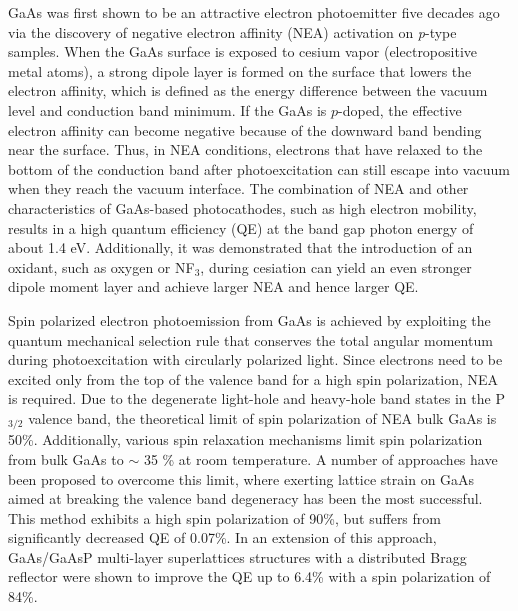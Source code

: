 GaAs was first shown to be an attractive electron photoemitter five decades ago via the discovery of negative electron affinity (NEA) activation on \emph{p}-type samples.\cite{scheer1965}
When the GaAs surface is exposed to cesium vapor (electropositive metal atoms), a strong dipole layer is formed on the surface that lowers the electron affinity, which is defined as the energy difference between the vacuum level and conduction band minimum.\cite{liu2017_ComprehensiveEvaluationFactors} If the GaAs is $p$-doped, the effective electron affinity can become negative because of the downward band bending near the surface. Thus, in NEA conditions, electrons that have relaxed to the bottom of the conduction band after photoexcitation can still escape into vacuum when they reach the vacuum interface. The combination of NEA and other characteristics of GaAs-based photocathodes, such as high electron mobility, results in a high quantum efficiency (QE) at the band gap photon energy of about 1.4 eV.\cite{pierce1976} Additionally, it was demonstrated that the introduction of an oxidant, such as oxygen or NF$_3$, during cesiation can yield an even stronger dipole moment layer and achieve larger NEA and hence larger QE.\cite{su1983,ciccacci1991_ComparativeStudyPreparation}



Spin polarized electron photoemission from GaAs is achieved by exploiting the quantum mechanical selection rule that conserves the total angular momentum during photoexcitation with circularly polarized light.\cite{pierce1976} Since electrons need to be excited only from the top of the valence band for a high spin polarization, NEA is required.
Due to the degenerate light-hole and heavy-hole band states in the P$_{3/2}$ valence band, the theoretical limit of spin polarization of NEA bulk GaAs is 50\%.
Additionally, various spin relaxation mechanisms limit spin polarization from bulk GaAs to $\sim$ 35 \% at room temperature.\cite{liu2017_ComprehensiveEvaluationFactors} A number of approaches have been proposed to overcome this limit,\cite{clayburn2013,mccarter2014_MeasurementElectronBeam} where exerting lattice strain on GaAs aimed at breaking the valence band degeneracy has been the most successful.\cite{maruyama1992_ElectronspinPolarizationPhotoemission} This method exhibits a high spin polarization of 90\%, but suffers from significantly decreased QE of 0.07\%. In an extension of this approach, GaAs/GaAsP multi-layer superlattices structures with a distributed Bragg reflector were shown to improve the QE up to 6.4\% with a spin polarization of 84\%.\cite{liu2016_RecordlevelQuantumEfficiency}


